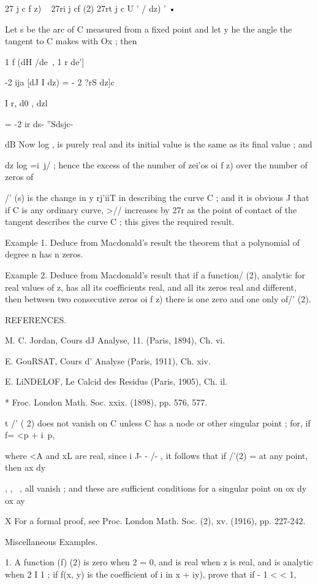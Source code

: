 27 j c f z) ~ 27ri j cf (2) 27rt j c U ' / dz) ' •

Let s be the arc of C measured from a fixed point and let y he the
angle the tangent to C makes with Ox ; then

1 f (dH /de\ , 1 r de']

-2 ija [dJ I dz) = - 2 ?rS dz]c

I r, d0 , dzl

= -2 ir ds- ''Sdsjc-

dB Now log , is purely real and its initial value is the same as its
final value ; and

dz log =i\ j/ ; hence the excess of the number of zei'os oi f z) over
the number of zeros of

/' (s) is the change in y rj'iiT in describing the curve C ; and it is
obvious J that if C is any ordinary curve, >// increases by 27r as the
point of contact of the tangent describes the curve C ; this gives the
required result.

Example 1. Deduce from Macdonald's result the theorem that a
polynomial of degree n has n zeros.

Example 2. Deduce from Macdonald's result that if a function/ (2),
analytic for real values of z, has all its coefficients real, and all
its zeros real and different, then between two consecutive zeros oi f
z) there is one zero and one only of/' (2).

REFERENCES.

M. C. Jordan, Cours dJ Analyse, 11. (Paris, 1894), Ch. vi.

E. GouRSAT, Cours d' Analyse (Paris, 1911), Ch. xiv.

E. LiNDELOF, Le Calcid des Residus (Paris, 1905), Ch. il.

* Froc. London Math. Soc. xxix. (1898), pp. 576, 577.

t /' ( 2) does not vanish on C unless C has a node or other singular
point ; for, if f= <p + i\ p,

where <A and xL are real, since i J- - /- , it follows that if /'(2) =
at any point, then ax dy

  , , ~, all vanish ; and these are sufficient conditions for a
singular point on ox dy ox ay

X For a formal proof, see Proc. London Math. Soc. (2), xv. (1916), pp.
227-242.

%
%

Miscellaneous Examples.

1. A function (f) (2) is zero when 2 = 0, and is real when z is real,
and is analytic when 2 I 1 ; if f(x, y) is the coefficient of i in x +
iy), prove that if - 1 < < 1,

